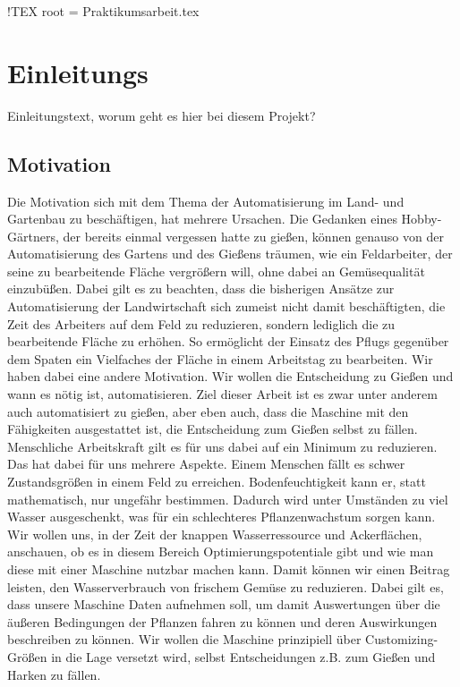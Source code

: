 !TEX root = Praktikumsarbeit.tex  %

\section{Einleitungs}
Einleitungstext, worum geht es hier bei diesem Projekt?

\subsection{Motivation} 

Die Motivation sich mit dem Thema der Automatisierung im Land- und Gartenbau zu beschäftigen, hat mehrere Ursachen. Die Gedanken eines Hobby-Gärtners, der bereits einmal vergessen hatte zu gießen, können genauso von der Automatisierung des Gartens und des Gießens träumen, wie ein Feldarbeiter, der seine zu bearbeitende Fläche vergrößern will, ohne dabei an Gemüsequalität einzubüßen.
\newline
Dabei gilt es zu beachten, dass die bisherigen Ansätze zur Automatisierung der Landwirtschaft sich zumeist nicht damit beschäftigten, die Zeit des Arbeiters auf dem Feld zu reduzieren, sondern lediglich die zu bearbeitende Fläche zu erhöhen. So ermöglicht der Einsatz des Pflugs gegenüber dem Spaten ein Vielfaches der Fläche in einem Arbeitstag zu bearbeiten. Wir haben dabei eine andere Motivation. Wir wollen die Entscheidung zu Gießen und wann es nötig ist, automatisieren. Ziel dieser Arbeit ist es zwar unter anderem auch automatisiert zu gießen, aber eben auch, dass die Maschine mit den Fähigkeiten ausgestattet ist, die Entscheidung zum Gießen selbst zu fällen.
\newline 
Menschliche Arbeitskraft gilt es für uns dabei auf ein Minimum zu reduzieren. Das hat dabei für uns mehrere Aspekte. Einem Menschen fällt es schwer Zustandsgrößen in einem Feld zu erreichen. Bodenfeuchtigkeit kann er, statt mathematisch, nur ungefähr bestimmen. Dadurch wird unter Umständen zu viel Wasser ausgeschenkt, was für ein schlechteres Pflanzenwachstum sorgen kann. Wir wollen uns, in der Zeit der knappen Wasserressource und Ackerflächen, anschauen, ob es in diesem Bereich Optimierungspotentiale gibt und wie man diese mit einer Maschine nutzbar machen kann. Damit können wir einen Beitrag leisten, den Wasserverbrauch von frischem Gemüse zu reduzieren. Dabei gilt es, dass unsere Maschine Daten aufnehmen soll, um damit Auswertungen über die äußeren Bedingungen der Pflanzen fahren zu können und deren Auswirkungen beschreiben zu können. Wir wollen die Maschine prinzipiell über Customizing-Größen in die Lage versetzt wird, selbst Entscheidungen z.B. zum Gießen und Harken zu fällen. 

